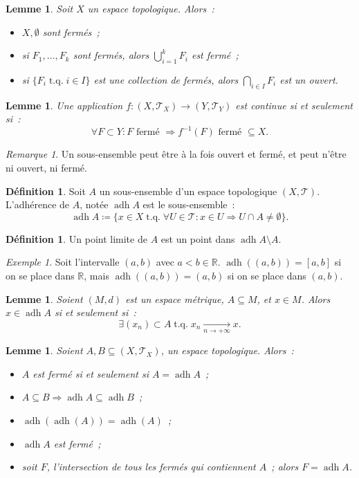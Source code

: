 \documentclass{report}
\newtheorem{lem}[thm]{Lemme}
\theoremstyle{definition}
\newtheorem{déf}[thm]{Définition}
\theoremstyle{remark}
\newtheorem*{rmq}{Remarque}
\newtheorem{ex}{Exemple}[section]
\DeclareMathOperator{\tq}{\text{ t.q. }}
\DeclareMathOperator{\adh}{adh}
\newcommand{\R}{\mathbb R}
\renewcommand{\top}{\mathcal T}
\begin{document}
		\begin{lem} Soit $X$ un espace topologique. Alors~:
		\begin{itemize}
			\item[$(i)$]   $X, \emptyset$ sont fermés~;
			\item[$(ii)$]  si $F_1, \ldots, F_k$ sont fermés, alors $\bigcup_{i=1}^kF_i$ est fermé~;
			\item[$(iii)$] si $\{F_i \tq i \in I\}$ est une collection de fermés, alors $\bigcap_{i \in I}F_i$ est un ouvert.
		\end{itemize}
		\end{lem}

		\begin{lem} Une application $f : (X, \top_X) \to (Y, \top_Y)$ est continue si et seulement si~:
		\[\forall F \subset Y : F \text{ fermé } \Rightarrow f^{-1}(F) \text{ fermé } \subseteq X.\]
		\end{lem}

		\begin{rmq} Un sous-ensemble peut être à la fois ouvert et fermé, et peut n'être ni ouvert, ni fermé.
		\end{rmq}

		\begin{déf} Soit $A$ un sous-ensemble d'un espace topologique $(X, \top)$. L'adhérence de $A$, notée $\adh A$ est le sous-ensemble~:
		\[\adh A \coloneqq \{x \in X \tq \forall U \in \top : x \in U \Rightarrow U \cap A \neq \emptyset\}.\]
		\end{déf}

		\begin{déf} Un point limite de $A$ est un point dans $\adh A \setminus A$.
		\end{déf}

		\begin{ex} Soit l'intervalle $(a, b)$ avec $a < b \in \R$. $\adh\left((a, b)\right) = [a, b]$ si on se place dans $\R$, mais
		$\adh\left((a, b)\right) = (a, b)$ si on se place dans $(a, b)$.
		\end{ex}

		\begin{lem} Soient $(M, d)$ est un espace métrique, $A \subseteq M$, et $x \in M$. Alors $x \in \adh A$ si et seulement si~:
		\[\exists (x_n) \subset A \tq x_n \xrightarrow[n \to +\infty]{} x.\]
		\end{lem}

		\begin{lem} Soient $A, B \subseteq (X, \top_X)$, un espace topologique. Alors~:
		\begin{itemize}
			\item[$(i)$]   $A$ est fermé si et seulement si $A = \adh A$~;
			\item[$(ii)$]  $A \subseteq B \Rightarrow \adh A \subseteq \adh B$~;
			\item[$(iii)$] $\adh\left(\adh(A)\right) = \adh(A)$~;
			\item[$(iv)$]  $\adh A$ est fermé~;
			\item[$(v)$]   soit $F$, l'intersection de tous les fermés qui contiennent $A$~; alors $F = \adh A$.
		\end{itemize}
		\end{lem}
\end{document}
